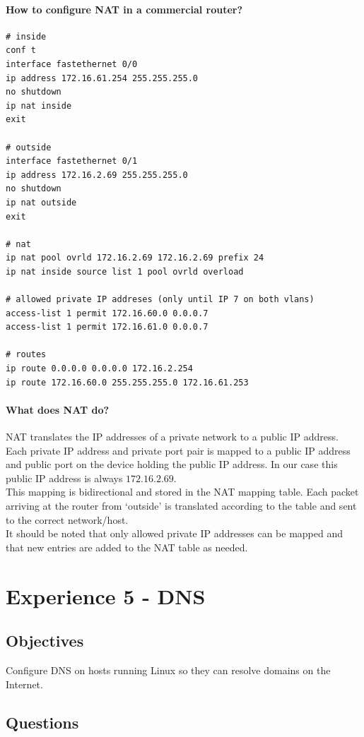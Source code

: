 \documentclass[11pt]{report}
\begin{document}
\paragraph{How to configure NAT in a commercial router?}
\begin{lstlisting}
# inside
conf t 
interface fastethernet 0/0
ip address 172.16.61.254 255.255.255.0 
no shutdown 
ip nat inside 
exit 

# outside
interface fastethernet 0/1
ip address 172.16.2.69 255.255.255.0 
no shutdown 
ip nat outside 
exit 

# nat
ip nat pool ovrld 172.16.2.69 172.16.2.69 prefix 24 
ip nat inside source list 1 pool ovrld overload 

# allowed private IP addreses (only until IP 7 on both vlans)
access-list 1 permit 172.16.60.0 0.0.0.7 
access-list 1 permit 172.16.61.0 0.0.0.7 

# routes
ip route 0.0.0.0 0.0.0.0 172.16.2.254 
ip route 172.16.60.0 255.255.255.0 172.16.61.253 
\end{lstlisting}

\paragraph{What does NAT do?}
NAT translates the IP addresses of a private network to a public IP address.
Each private IP address and private port pair is mapped to a public IP address
and public port on the device holding the public IP address. In our case this
public IP address is always $172.16.2.69$.\\
This mapping is bidirectional and stored in the NAT mapping table. Each packet
arriving at the router from `outside' is translated according to the table
and sent to the correct network/host.\\
It should be noted that only allowed private IP addresses can be mapped and that
new entries are added to the NAT table as needed.

\section{Experience 5 - DNS}

\subsection{Objectives}
Configure DNS on hosts running Linux so they can resolve domains on the Internet.

\subsection{Questions}
\end{document}

